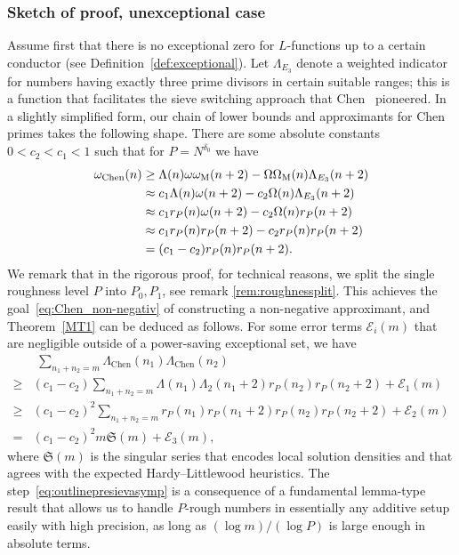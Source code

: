 \documentclass[12pt]{amsart}
\theoremstyle{definition}
\theoremstyle{remark}
\numberwithin{equation}{section}
\newcommand{\1}{\mathbf{1}}
\begin{document}
\subsubsection{Sketch of proof, unexceptional case}
\label{sec:1.2.5}
    Assume first that there is no exceptional zero for $L$-functions up to a certain conductor (see Definition~\ref{def:exceptional}). Let $\Lambda_{E_3}$ denote a weighted indicator for numbers having exactly three prime divisors in certain suitable ranges; this is a function that facilitates the sieve switching approach that Chen~\cite{chen} pioneered. In a slightly simplified form, our chain of lower bounds and approximants for Chen primes takes the following shape. There are some absolute constants $0<c_2<c_1<1$ such that for $P=N^{\delta_0}$  we have
	\begin{align}
		\omega_{\text{Chen}}(n)&\geq \Lambda(n) \omega \omega_{\textup{M}}(n+2)-\Omega\Omega_{\textup{M}}(n)\Lambda_{E_3}(n+2)\label{eq_outline1} \\
		&\approx c_1\Lambda(n) \omega (n+2)- c_2\Omega(n)\Lambda_{E_3}(n+2)\label{eq_outline2}\\
		&\approx c_1 r_{P}(n) \omega(n+2) - c_2\Omega(n)r_{P}(n+2)\label{eq_outline3}\\
		&\approx c_1 r_{P}(n) r_{P} (n+2)-c_2 r_{P}(n) r_{P} (n+2) \label{eq_outline4}\\
		&= (c_1-c_2)r_{P}(n) r_{P} (n+2). \nonumber
	\end{align}
    We remark that in the rigorous proof, for technical reasons, we split the single roughness level $P$ into $P_0, P_1$, see remark \ref{rem:roughnessplit}. This achieves the goal~\eqref{eq:Chen_non-negativ} of constructing a non-negative approximant, and Theorem~\ref{MT1} can be deduced as follows. For some error terms $\mathcal{E}_i(m)$ that are negligible outside of a power-saving exceptional set, we have
\begin{align}
    &\nonumber \,\,\sum_{n_1+n_2=m}\Lambda_{\text{Chen}}(n_1)\Lambda_{\text{Chen}}(n_2)\\
    \nonumber
    \geq& (c_1-c_2)\sum_{n_1+n_2=m}\Lambda(n_1)\Lambda_2(n_1+2)r_{P}(n_2)r_{P}(n_2+2)+\mathcal{E}_1(m)\\
	\nonumber
    \geq& (c_1-c_2)^2\sum_{n_1+n_2=m}r_{P}(n_1)r_{P}(n_1+2)r_{P}(n_2)r_{P}(n_2+2)+\mathcal{E}_2(m)\\
	\label{eq:outlinepresievasymp}=& (c_1-c_2)^2 m \mathfrak{S}(m)+\mathcal{E}_3(m),
\end{align}
where $\mathfrak{S}(m)$ is the singular series that encodes local solution densities and that agrees with the expected Hardy--Littlewood heuristics. The step~\eqref{eq:outlinepresievasymp} is a consequence of a fundamental lemma-type result that allows us to handle $P$-rough numbers in essentially any additive setup easily with high precision, as long as $(\log m)/(\log P)$ is large enough in absolute terms. 
\end{document}
